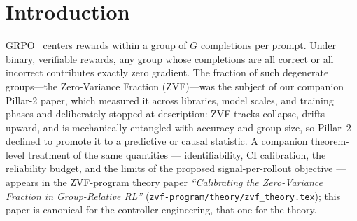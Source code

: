 \documentclass{article}
\begin{document}
\begin{abstract}
group size on ZVF spikes. In a four-arm open-trainer audit, adaptive-$G$
matches the best fixed-recipe held-out gain ($+0.575$) at $186$ rollouts,
while DAPO-style dynamic sampling drives ZVF to $0.00$ at $+45\%$ rollout
cost---an accuracy-versus-compute trade, not a controller win. In the larger
2,560-observation controller trace, 1,723 of 1,867 escalation events (92.3\%)
occur on all-correct groups and only 144 on all-wrong groups. This asymmetry
shows that a symmetric ZVF trigger mostly spends on solved prompts; deleting
those fires is only a counterfactual proposal because performance preservation
has not been measured. No result here establishes prospective superiority over
static $G{=}16$, Dr.~GRPO, or dynamic sampling. All intervention evidence is
single-task, small-$n$, or retrospective, and the paper ends with the matched-
budget, multi-seed test required to earn control authority.
\end{abstract}
 \section{Introduction}
\label{sec:p7-intro}
GRPO~\citep{shao2024deepseekmath, guo2025deepseekr1} centers rewards within a
group of $G$ completions per prompt. Under binary, verifiable rewards, any
group whose completions are all correct or all incorrect contributes exactly
zero gradient. The fraction of such degenerate groups---the Zero-Variance
Fraction (ZVF)---was the subject of our companion Pillar-2 paper, which
measured it across libraries, model scales, and training phases and
deliberately stopped at description: ZVF tracks collapse, drifts upward, and
is mechanically entangled with accuracy and group size, so Pillar~2 declined
to promote it to a predictive or causal statistic. A companion
theorem-level treatment of the same quantities --- identifiability, CI
calibration, the reliability budget, and the limits of the proposed
signal-per-rollout objective --- appears in the ZVF-program theory paper
\emph{``Calibrating the Zero-Variance Fraction in Group-Relative RL''}
(\texttt{zvf-program/theory/zvf\_theory.tex}); this paper is canonical for
the controller engineering, that one for the theory.
\end{document}
